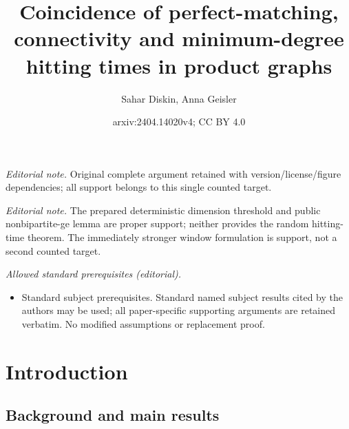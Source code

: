 \documentclass[10pt,a4paper]{article}
\title{Coincidence of perfect-matching, connectivity and minimum-degree hitting times in product graphs}
\author{Sahar Diskin, Anna Geisler}
\date{arxiv:2404.14020v4; CC BY 4.0}
\begin{document}
\maketitle
\noindent\textit{Editorial note.} Original complete argument retained with version/license/figure dependencies; all support belongs to this single counted target.\par\medskip
\noindent\textit{Editorial note.} The prepared deterministic dimension threshold and public nonbipartite-ge lemma are proper support; neither provides the random hitting-time theorem. The immediately stronger window formulation is support, not a second counted target.\par\medskip
\noindent\textit{Allowed standard prerequisites (editorial).}\begin{itemize}
\item Standard subject prerequisites. Standard named subject results cited by the authors may be used; all paper-specific supporting arguments are retained verbatim. No modified assumptions or replacement proof.
\end{itemize}\medskip
\section{Introduction}

\subsection{Background and main results}
\end{document}

